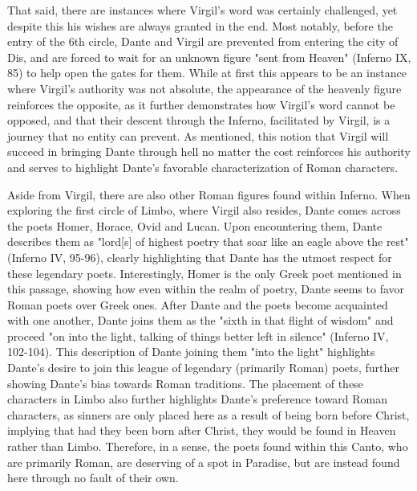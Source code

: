 \documentclass[12pt]{article}
\begin{document}
	That said, there are instances where Virgil's word was certainly challenged, yet despite this his wishes are always 
	granted in the end. Most notably, before the entry of the 6th circle, Dante and 
	Virgil are prevented from entering the city of Dis, and are forced to wait for an unknown figure "sent from Heaven" 
	(Inferno IX, 85) to help 
	open the gates for them. While at first this appears to be an instance where Virgil's authority was not absolute, the appearance 
	of the heavenly figure reinforces the opposite, as it further demonstrates how Virgil's word cannot be opposed, and that 
	their descent through the Inferno, facilitated by Virgil, is a journey that no entity can prevent. As mentioned, this notion 
	that Virgil will succeed in bringing Dante through hell no matter the cost reinforces his authority and serves to highlight 
	Dante's favorable characterization of Roman characters. 

	Aside from Virgil, there are also other Roman figures found within Inferno. When exploring the first circle of Limbo, where 
	Virgil also resides, Dante comes across the poets Homer, Horace, Ovid and Lucan. Upon encountering them, Dante describes 
	them as "lord[s] of highest poetry that soar like an eagle above the rest" (Inferno IV, 95-96), clearly highlighting that Dante 
	has the utmost respect for these legendary poets. Interestingly, Homer is the only Greek poet mentioned in this passage, 
	showing how even within the realm of poetry, Dante seems to favor Roman poets over Greek ones. After Dante and the poets become 
	acquainted with one another, Dante joins them as the "sixth in that flight of wisdom" and proceed "on into the light, 
	talking of things better left in silence" (Inferno IV, 102-104). This description of Dante joining them "into the light" 
	highlights Dante's desire to join this league of legendary (primarily Roman) poets, further showing Dante's bias towards Roman 
	traditions. The placement of these characters in Limbo also further highlights Dante's preference toward Roman characters, as 
	sinners are only placed here as a result of being born before Christ, implying that had they been born after Christ, they would be
	found in Heaven rather than Limbo. Therefore, in a sense, the poets found within this Canto, who are primarily Roman, are 
	deserving of a spot in 
	Paradise, but are instead found here through no fault of their own. 
\end{document}
